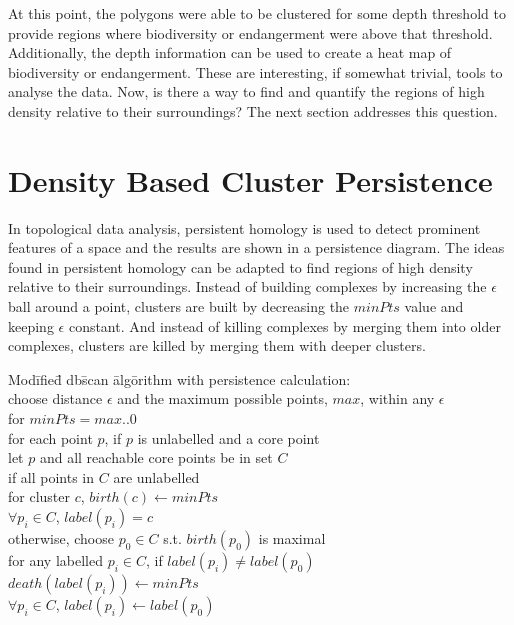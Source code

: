 \documentclass[11pt, fullpage,letterpaper]{article}
\begin{document}
		At this point, the polygons were able to be clustered for some depth threshold to provide regions where biodiversity or endangerment were above that threshold. Additionally, the depth information can be used to create a heat map of biodiversity or endangerment. These are interesting, if somewhat trivial, tools to analyse the data. Now, is there a way to find and quantify the regions of high density relative to their surroundings? The next section addresses this question.
		
	\section{Density Based Cluster Persistence}
		In topological data analysis, persistent homology is used to detect prominent features of a space and the results are shown in a persistence diagram. The ideas found in persistent homology can be adapted to find regions of high density relative to their surroundings. Instead of building complexes by increasing the $\epsilon$ ball around a point, clusters are built by decreasing the $minPts$ value and keeping $\epsilon$ constant. And instead of killing complexes by merging them into older complexes, clusters are killed by merging them with deeper clusters.
		
		\begin{tabbing}
			Mod\= ifie\= d db\= scan \= alg\= orithm with persistence calculation:\\
			\> choose distance $\epsilon$ and the maximum possible points, $max$, within any $\epsilon$\\
			\> for $minPts = max..0$\\
			\> \> for each point $p$, if $p$ is unlabelled and a core point\\
			\> \> \> let $p$ and all reachable core points be in set $C$\\
			\> \> \> \> if all points in $C$ are unlabelled\\
			\> \> \> \> \> for cluster $c$, $birth(c) \leftarrow minPts$\\
			\> \> \> \> \> $\forall p_i \in C$, $label(p_i) = c$\\
			\> \> \> otherwise, choose $p_0 \in C$ s.t. $birth(p_0)$ is maximal\\
			\> \> \> \> for any labelled $p_i \in C$, if $label(p_i) \neq label(p_0)$\\
			\> \> \> \> \> $death(label(p_i)) \leftarrow minPts$\\
			\> \> \> \> \> $\forall p_i \in C$, $label(p_i) \leftarrow label(p_0)$\\
		\end{tabbing}
		
\end{document}
